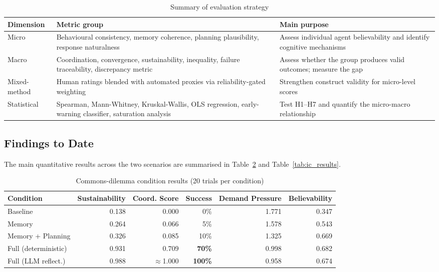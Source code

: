 \documentclass[11pt]{article}
\begin{document}
\begin{table}[h]
\centering
\caption{Summary of evaluation strategy}
\label{tab:metrics}
\begin{tabular}{p{}p{}p{}}
\toprule
Dimension & Metric group & Main purpose \\
\midrule
Micro & Behavioural consistency, memory coherence, planning plausibility, response naturalness & Assess individual agent believability and identify cognitive mechanisms \\
Macro & Coordination, convergence, sustainability, inequality, failure traceability, discrepancy metric & Assess whether the group produces valid outcomes; measure the gap \\
Mixed-method & Human ratings blended with automated proxies via reliability-gated weighting & Strengthen construct validity for micro-level scores \\
Statistical & Spearman, Mann-Whitney, Kruskal-Wallis, OLS regression, early-warning classifier, saturation analysis & Test H1--H7 and quantify the micro-macro relationship \\
\bottomrule
\end{tabular}
\end{table}

\subsection{Findings to Date}

The main quantitative results across the two scenarios are summarised in Table~\ref{tab:cd_results} and Table~\ref{tab:ic_results}.

\begin{table}[h]
\centering
\caption{Commons-dilemma condition results (20 trials per condition)}
\label{tab:cd_results}
\begin{tabular}{lrrrrr}
\toprule
Condition & Sustainability & Coord. Score & Success & Demand Pressure & Believability \\
\midrule
Baseline & 0.138 & 0.000 & 0\% & 1.771 & 0.347 \\
Memory & 0.264 & 0.066 & 5\% & 1.578 & 0.543 \\
Memory + Planning & 0.326 & 0.085 & 10\% & 1.325 & 0.669 \\
Full (deterministic) & 0.931 & 0.709 & \textbf{70\%} & 0.998 & 0.682 \\
Full (LLM reflect.) & 0.988 & $\approx$1.000 & \textbf{100\%} & 0.958 & 0.674 \\
\bottomrule
\end{tabular}
\end{table}
\end{document}
